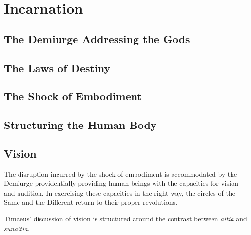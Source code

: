 \chapter{Incarnation} %
\label{cha:incarnation}

\section{The Demiurge Addressing the Gods} %
\label{sec:the_demiurge_addressing_the_gods}




\section{The Laws of Destiny} %
\label{sec:the_laws_of_destiny}




\section{The Shock of Embodiment} %
\label{sec:the_shock_of_embodiment}




\section{Structuring the Human Body} %
\label{sec:structuring_the_human_body}




\section{Vision} %
\label{sec:vision}

The disruption incurred by the shock of embodiment is accommodated by the Demiurge providentially providing human beings with the capacities for vision and audition. In exercising these capacities in the right way, the circles of the Same and the Different return to their proper revolutions. 

Timaeus' discussion of vision is structured around the contrast between \emph{aitia} and \emph{sunaitia}.


